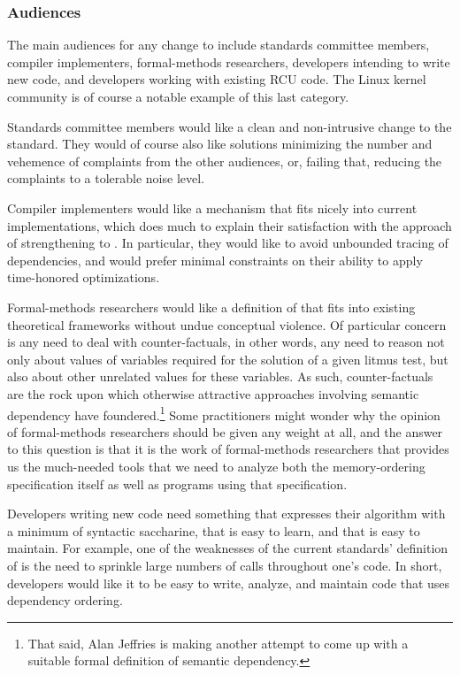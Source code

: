 \documentclass[letterpaper,twocolumn,10pt]{article}
\begin{document}
\subsubsection{Audiences}
\label{sec:Audiences}

The main audiences for any change to  include
standards committee members, compiler implementers, formal-methods
researchers, developers intending to write new code, and developers working
with existing RCU code.
The Linux kernel community is of course a notable example of this
last category.

Standards committee members would like a clean and non-intrusive change
to the standard.
They would of course also like solutions minimizing the number and
vehemence of complaints from the other audiences, or, failing that,
reducing the complaints to a tolerable noise level.

Compiler implementers would like a mechanism that fits nicely into current
implementations, which does much to explain their satisfaction with the
approach of strengthening  to
.
In particular, they would like to avoid unbounded tracing of dependencies,
and would prefer minimal constraints on their ability to apply time-honored
optimizations.

Formal-methods researchers would like a definition of
 that fits into existing theoretical frameworks
without undue conceptual violence.
Of particular concern is any need to deal with counter-factuals, in other
words, any need to reason not only about values of variables required
for the solution of a given litmus test, but also about other unrelated
values for these variables.
As such, counter-factuals are the rock upon which otherwise attractive
approaches involving semantic dependency have foundered.\footnote{
	That said, Alan Jeffries is making another attempt to come up
	with a suitable formal definition of semantic dependency.}
Some practitioners might wonder why the opinion of formal-methods
researchers should be given any weight at all, and the answer to
this question is that it is the work of formal-methods
researchers that provides us the much-needed tools that we need
to analyze both the memory-ordering specification itself as well as
programs using that specification.

Developers writing new code need something that expresses their algorithm
with a minimum of syntactic saccharine, that is easy to learn, and that
is easy to maintain.
For example, one of the weaknesses of the current standards' definition of
 is the need to sprinkle large numbers of
 calls throughout one's code.
In short, developers would like it to be easy to write, analyze, and
maintain code that uses dependency ordering.
\end{document}
